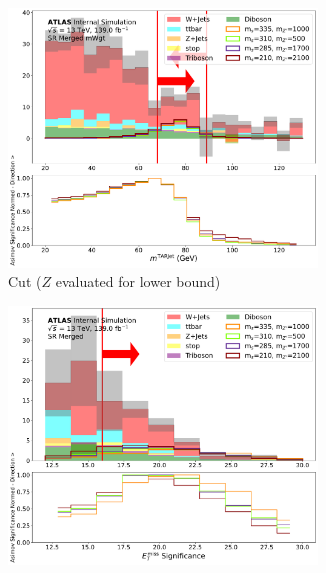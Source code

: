 \begin{figure}[htbp]
\begin{subfigure}[t]{0.48\textwidth}
    \centering
     \includegraphics[width = 0.9\textwidth]{Figures/5/SR1L_Merged_mWgt/TARJets10_mTAR0_normSig_N_1.pdf}
     \caption{\mTAR Cut  (\(Z\) evaluated for lower bound)}
    \end{subfigure}
    \begin{subfigure}[t]{0.48\textwidth}
    \centering
     \includegraphics[width = 0.9\textwidth]{Figures/5/SR1L_Merged/MetTST_Significance_normSig_N_1.pdf}
    \caption{\metsig}
    \end{subfigure}
    \begin{subfigure}[t]{0.48\textwidth}
    \centering

\end{subfigure}
\end{figure}
